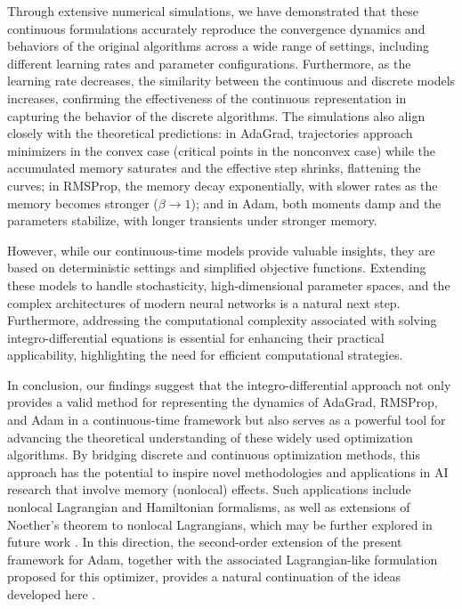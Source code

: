 \documentclass{article} %
\begin{document}
Through extensive numerical simulations, we have demonstrated that these continuous formulations accurately reproduce the convergence dynamics and behaviors of the original algorithms across a wide range of settings, including different learning rates and parameter configurations. Furthermore, as the learning rate decreases, the similarity between the continuous and discrete models increases, confirming the effectiveness of the continuous representation in capturing the behavior of the discrete algorithms. The simulations also align closely with the theoretical predictions: in AdaGrad, trajectories approach minimizers in the convex case (critical points in the nonconvex case) while the accumulated memory saturates and the effective step shrinks, flattening the curves; in RMSProp, the memory decay exponentially, with slower rates as the memory becomes stronger ($\beta \to 1$); and in Adam, both moments damp and the parameters stabilize, with longer transients under stronger memory.

However, while our continuous-time models provide valuable insights, they are based on deterministic settings and simplified objective functions. Extending these models to handle stochasticity, high-dimensional parameter spaces, and the complex architectures of modern neural networks is a natural next step. Furthermore, addressing the computational complexity associated with solving integro-differential equations is essential for enhancing their practical applicability, highlighting the need for efficient computational strategies.

In conclusion, our findings suggest that the integro-differential approach not only provides a valid method for representing the dynamics of AdaGrad, RMSProp, and Adam in a continuous-time framework but also serves as a powerful tool for advancing the theoretical understanding of these widely used optimization algorithms. By bridging discrete and continuous optimization methods, this approach has the potential to inspire novel methodologies and applications in AI research that involve memory (nonlocal) effects. Such applications include nonlocal Lagrangian and Hamiltonian formalisms, as well as extensions of Noether’s theorem to nonlocal Lagrangians, which may be further explored in future work \cite{heredia2025nonlocalmechanics}. In this direction, the second-order extension of the present framework for Adam, together with the associated Lagrangian-like formulation proposed for this optimizer, provides a natural continuation of the ideas developed here \cite{heredia2026adamadamlikelagrangianssecondorder}.
\end{document}
